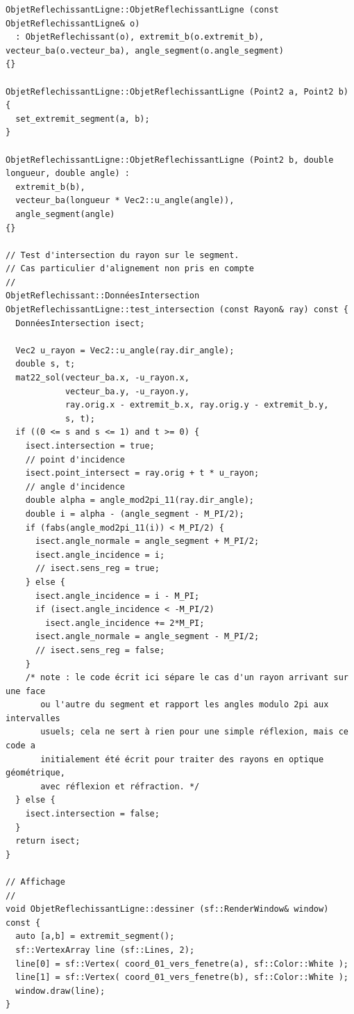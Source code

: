 \documentclass{book}
\begin{document}
\begin{correction}
\begin{verbatim}
ObjetReflechissantLigne::ObjetReflechissantLigne (const ObjetReflechissantLigne& o)
  : ObjetReflechissant(o), extremit_b(o.extremit_b), vecteur_ba(o.vecteur_ba), angle_segment(o.angle_segment)
{}

ObjetReflechissantLigne::ObjetReflechissantLigne (Point2 a, Point2 b) {
  set_extremit_segment(a, b);
}

ObjetReflechissantLigne::ObjetReflechissantLigne (Point2 b, double longueur, double angle) :
  extremit_b(b),
  vecteur_ba(longueur * Vec2::u_angle(angle)),
  angle_segment(angle)
{}

// Test d'intersection du rayon sur le segment.
// Cas particulier d'alignement non pris en compte
//
ObjetReflechissant::DonnéesIntersection ObjetReflechissantLigne::test_intersection (const Rayon& ray) const {
  DonnéesIntersection isect;

  Vec2 u_rayon = Vec2::u_angle(ray.dir_angle);
  double s, t;
  mat22_sol(vecteur_ba.x, -u_rayon.x,
            vecteur_ba.y, -u_rayon.y,
            ray.orig.x - extremit_b.x, ray.orig.y - extremit_b.y,
            s, t);
  if ((0 <= s and s <= 1) and t >= 0) {
    isect.intersection = true;
    // point d'incidence
    isect.point_intersect = ray.orig + t * u_rayon;
    // angle d'incidence
    double alpha = angle_mod2pi_11(ray.dir_angle);
    double i = alpha - (angle_segment - M_PI/2);
    if (fabs(angle_mod2pi_11(i)) < M_PI/2) {
      isect.angle_normale = angle_segment + M_PI/2;
      isect.angle_incidence = i;
      // isect.sens_reg = true;
    } else {
      isect.angle_incidence = i - M_PI;
      if (isect.angle_incidence < -M_PI/2)
        isect.angle_incidence += 2*M_PI;
      isect.angle_normale = angle_segment - M_PI/2;
      // isect.sens_reg = false;
    }
    /* note : le code écrit ici sépare le cas d'un rayon arrivant sur une face
       ou l'autre du segment et rapport les angles modulo 2pi aux intervalles
       usuels; cela ne sert à rien pour une simple réflexion, mais ce code a
       initialement été écrit pour traiter des rayons en optique géométrique,
       avec réflexion et réfraction. */
  } else {
    isect.intersection = false;
  }
  return isect;
}

// Affichage
//
void ObjetReflechissantLigne::dessiner (sf::RenderWindow& window) const {
  auto [a,b] = extremit_segment();
  sf::VertexArray line (sf::Lines, 2);
  line[0] = sf::Vertex( coord_01_vers_fenetre(a), sf::Color::White );
  line[1] = sf::Vertex( coord_01_vers_fenetre(b), sf::Color::White );
  window.draw(line);
}
\end{verbatim}

\end{correction}
\end{document}
